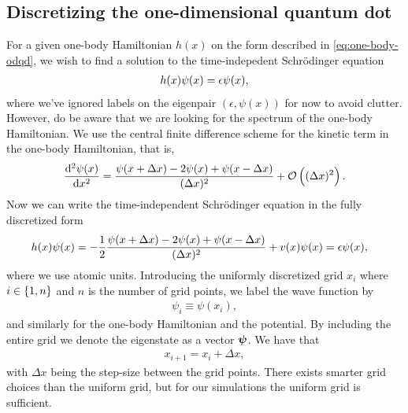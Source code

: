     \subsection{Discretizing the one-dimensional quantum dot}
        \label{subsec:discretizing-the-odqd}
        For a given one-body Hamiltonian $h(x)$ on the form described in
        \autoref{eq:one-body-odqd}, we wish to find a solution to the
        time-indepedent Schrödinger equation
        \begin{align}
            h(x)\psi(x) = \epsilon \psi(x),
        \end{align}
        where we've ignored labels on the eigenpair $(\epsilon, \psi(x))$ for
        now to avoid clutter.
        However, do be aware that we are looking for the spectrum of the
        one-body Hamiltonian.
        We use the central finite difference scheme for the kinetic term in the
        one-body Hamiltonian, that is,
        \begin{align}
            \dod[2]{\psi(x)}{x}
            = \frac{
                \psi(x + \Delta x) - 2\psi(x) + \psi(x - \Delta x)
            }{(\Delta x)^2}
            + \mathcal{O}\para{(\Delta x)^2}.
        \end{align}
        Now we can write the time-independent Schrödinger equation in the fully
        discretized form
        \begin{align}
            h(x) \psi(x)
            &= -\frac{1}{2}
            \frac{
                \psi(x + \Delta x) - 2\psi(x) + \psi(x - \Delta x)
            }{(\Delta x)^2}
            + v(x)\psi(x)
            = \epsilon \psi(x),
        \end{align}
        where we use atomic units.
        Introducing the uniformly discretized grid $x_i$ where $i \in \left\{ 1,
        n \right\}$ and $n$ is the number of grid points, we label the wave function by
        \begin{align}
            \psi_i \equiv \psi(x_i),
        \end{align}
        and similarly for the one-body Hamiltonian and the potential.
        By including the entire grid we denote the eigenstate as a vector
        $\boldsymbol{\psi}$.
        We have that
        \begin{align}
            x_{i + 1} = x_i + \Delta x,
        \end{align}
        with $\Delta x$ being the step-size between the grid points.
        There exists smarter grid choices than the uniform grid, but for our
        simulations the uniform grid is sufficient.
